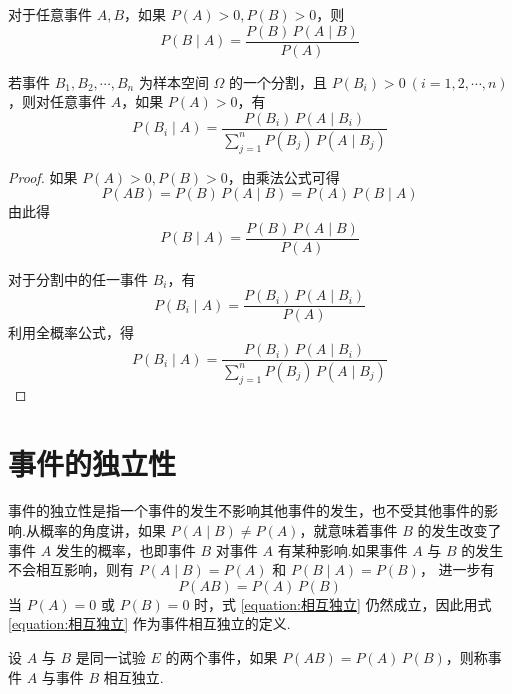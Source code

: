 \begin{theorem}[][贝叶斯公式]
    \indent 对于任意事件 $A,B$，如果 $P(A)>0, P(B)>0$，则
    \begin{equation}
        P(B \mid A)=\dfrac{P(B) \, P(A \mid B)}{P(A)}
    \end{equation}

    若事件 $B_1,B_2,\cdots,B_n$ 为样本空间 $\varOmega$ 的一个分割，且 $P(B_i)>0 \ (i=1,2,\cdots,n)$，则对任意事件 $A$，如果 $P(A)>0$，有
    \begin{equation} \label{equation:bayes}
        P(B_i \mid A) = \dfrac{P(B_i) \, P(A \mid B_i)}{\displaystyle\sum_{j=1}^n P(B_j) \, P(A \mid B_j)}
    \end{equation}
\end{theorem}

\begin{proof}
    如果 $P(A)>0, P(B)>0$，由乘法公式可得
    $$
    P(AB) = P(B) \, P(A \mid B) = P(A) \, P(B \mid A)
    $$
    由此得
    $$
    P(B \mid A)=\dfrac{P(B) \, P(A \mid B)}{P(A)}
    $$

    对于分割中的任一事件 $B_i$，有
    $$
    P(B_i \mid A)=\dfrac{P(B_i) \, P(A \mid B_i)}{P(A)}
    $$
    利用全概率公式，得
    $$
    P(B_i \mid A) = \dfrac{P(B_i) \, P(A \mid B_i)}{\displaystyle\sum_{j=1}^n P(B_j) \, P(A \mid B_j)}
    $$
\end{proof}

\section{事件的独立性}

事件的独立性是指一个事件的发生不影响其他事件的发生，也不受其他事件的影响.从概率的角度讲，如果 $P(A \mid B) \not= P(A)$，就意味着事件 $B$ 的发生改变了事件 $A$ 发生的概率，也即事件 $B$ 对事件 $A$ 有某种影响.如果事件 $A$ 与 $B$ 的发生不会相互影响，则有 $P(A \mid B) = P(A)$ 和 $P(B \mid A) = P(B)$， 进一步有
\begin{equation} \label{equation:相互独立}
    P(AB) = P(A) \, P(B)
\end{equation}
当 $P(A)=0$ 或 $P(B)=0$ 时，式 \eqref{equation:相互独立} 仍然成立，因此用式 \eqref{equation:相互独立} 作为事件相互独立的定义.

\begin{definition}
    \indent 设 $A$ 与 $B$ 是同一试验 $E$ 的两个事件，如果 $P(AB) = P(A) \, P(B)$，则称事件 $A$ 与事件 $B$ {\heiti 相互独立}.
\end{definition}

